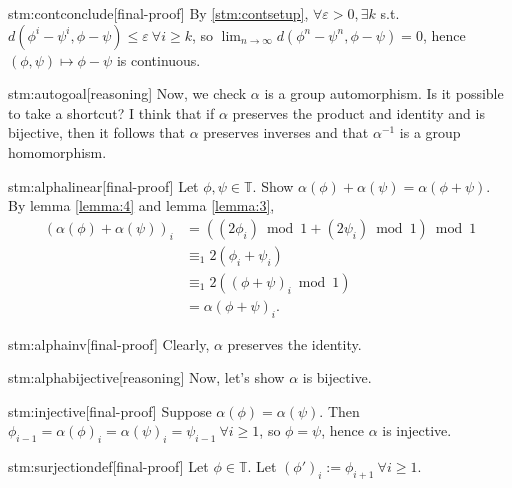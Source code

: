 \begin{stm}{stm:contconclude}[final-proof]
By \ref{stm:contsetup}, $\forall \varepsilon > 0, \exists k$ s.t. $d(\phi^i - \psi^i, \phi - \psi) \le \varepsilon \ \forall i \ge k$, so $\lim_{n \to \infty} d(\phi^n - \psi^n, \phi - \psi) = 0$, hence $(\phi, \psi) \mapsto \phi - \psi$ is continuous.
\end{stm}

\begin{stm}{stm:autogoal}[reasoning]
Now, we check $\alpha$ is a group automorphism. Is it possible to take a shortcut? I think that if $\alpha$ preserves the product and identity and is bijective, then it follows that $\alpha$ preserves inverses and that $\alpha^{-1}$ is a group homomorphism.
\end{stm}

\begin{stm}{stm:alphalinear}[final-proof]
    Let $\phi, \psi \in \mathbb{T}$. Show $\alpha(\phi) + \alpha(\psi) = \alpha(\phi + \psi)$. By lemma \ref{lemma:4} and lemma \ref{lemma:3},
    \begin{align*}
    (\alpha(\phi) + \alpha(\psi))_i 
    &= \left((2\phi_i) \bmod 1 + (2\psi_i) \bmod 1\right) \bmod 1 \\
    &\equiv_1 2(\phi_i + \psi_i) \\
    &\equiv_1 2\left((\phi + \psi)_i \bmod 1\right) \\
    &= \alpha(\phi + \psi)_i.
    \end{align*}
\end{stm}

\begin{stm}{stm:alphainv}[final-proof]
Clearly, $\alpha$ preserves the identity.
\end{stm}

\begin{stm}{stm:alphabijective}[reasoning]
Now, let’s show $\alpha$ is bijective.
\end{stm}

\begin{stm}{stm:injective}[final-proof]
Suppose $\alpha(\phi) = \alpha(\psi)$. Then $\phi_{i-1} = \alpha(\phi)_i = \alpha(\psi)_i = \psi_{i-1} \ \forall i \ge 1$, so $\phi = \psi$, hence $\alpha$ is injective.
\end{stm}

\begin{stm}{stm:surjectiondef}[final-proof]
Let $\phi \in \mathbb{T}$. Let $(\phi')_i := \phi_{i+1} \ \forall i \ge 1$.
\end{stm}

